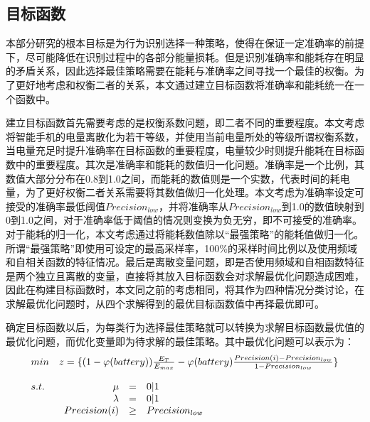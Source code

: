 \subsection{目标函数}
\par 本部分研究的根本目标是为行为识别选择一种策略，使得在保证一定准确率的前提下，尽可能降低在识别过程中的各部分能量损耗。但是识别准确率和能耗存在明显的矛盾关系，因此选择最佳策略需要在能耗与准确率之间寻找一个最佳的权衡。为了更好地考虑和权衡二者的关系，本文通过建立目标函数将准确率和能耗统一在一个函数中。
\par 建立目标函数首先需要考虑的是权衡系数问题，即二者不同的重要程度。本文考虑将智能手机的电量离散化为若干等级，并使用当前电量所处的等级所谓权衡系数，当电量充足时提升准确率在目标函数的重要程度，电量较少时则提升能耗在目标函数中的重要程度。其次是准确率和能耗的数值归一化问题。准确率是一个比例，其数值大部分分布在0.8到1.0之间，而能耗的数值则是一个实数，代表时间的耗电量，为了更好权衡二者关系需要将其数值做归一化处理。本文考虑为准确率设定可接受的准确率最低阈值$Precision_{low}$，并将准确率从$Precision_{low}$到1.0的数值映射到0到1.0之间，对于准确率低于阈值的情况则变换为负无穷，即不可接受的准确率。对于能耗的归一化，本文考虑通过将能耗数值除以“最强策略”的能耗值做归一化。所谓“最强策略”即使用可设定的最高采样率，100\%的采样时间比例以及使用频域和自相关函数的特征情况。最后是离散变量问题，即是否使用频域和自相函数特征是两个独立且离散的变量，直接将其放入目标函数会对求解最优化问题造成困难，因此在构建目标函数时，本文同之前的考虑相同，将其作为四种情况分类讨论，在求解最优化问题时，从四个求解得到的最优目标函数值中再择最优即可。
\par 确定目标函数以后，为每类行为选择最佳策略就可以转换为求解目标函数最优值的最优化问题，而优化变量即为待求解的最佳策略。其中最优化问题可以表示为：
\begin{equation}
  \begin{array}{ll}
    min  & z=\{(1-\varphi (battery)) \frac{E_T}{E_{max}} - \varphi (battery) \frac{Precision(i) - Precision_{low}}{1 - Precision_{low}}\} \\
    \\
    s.t. & \begin{array}[t]{rll}  
             \mu 			 &  =    & 0|1 \\
             \lambda         &  =    & 0|1  \\
             Precision(i)    & \geq  & Precision_{low}
           \end{array}
  \end{array}
\end{equation}

